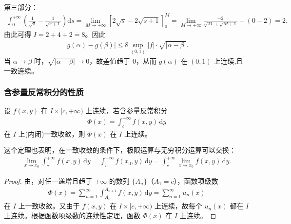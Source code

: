 \documentclass[../../main.tex]{subfiles}%
\begin{document}
\begin{solution}
\begin{enumerate}[(1)]
\begin{align*}
\end{align*}
第三部分：
\begin{align*}
\int_{0}^{+\infty} \left( \frac{1}{\sqrt{s}} - \frac{1}{\sqrt{s+1}} \right) \mathrm{d}s = \lim_{M \to +\infty} \left[ 2\sqrt{s} - 2\sqrt{s+1} \right]_{0}^{M} = \lim_{M \to +\infty} \frac{-2}{\sqrt{M} + \sqrt{M+1}} - (0 - 2) = 2.
\end{align*}
由此可得 \(I = 2 + 4 + 2 = 8\)。因此
\begin{align*}
|g(\alpha) - g(\beta)| \leqslant 8 \sup_{(0,1)} |f| \cdot \sqrt{|\alpha - \beta|}.
\end{align*}
当 \(\alpha \to \beta\) 时，\(\sqrt{|\alpha - \beta|} \to 0\)，故差值趋于 \(0\)，从而 \(g(\alpha)\) 在 \((0,1)\) 上连续,且一致连续。
\end{enumerate}
\end{solution}

\subsubsection{含参量反常积分的性质}

\begin{theorem}[含参反常积分的连续性]\label{theorem:含参量反常积分的连续性}
设 \( f(x,y) \) 在 \( I \times [c, +\infty) \) 上连续，若含参量反常积分
\begin{align}\label{12}
\Phi(x) = \int_{c}^{+\infty} f(x,y) \, \mathrm{d}y
\end{align}
在 \( I \) 上(内闭)一致收敛，则 \( \Phi(x) \) 在 \( I \) 上连续。
\end{theorem}
\begin{note}
这个定理也表明，在一致收敛的条件下，极限运算与无穷积分运算可以交换：
\begin{align}\label{eq::::--34802jrw4f3454t}
\lim_{x \to x_0} \int_{c}^{+\infty} f(x,y) \, \mathrm{d}y = \int_{c}^{+\infty} f(x_0,y) \, \mathrm{d}y = \int_{c}^{+\infty} \lim_{x \to x_0} f(x,y) \, \mathrm{d}y.
\end{align}
\end{note}
\begin{proof}
由，对任一递增且趋于 \( +\infty \) 的数列 \( \{A_n\} \)（\( A_1 = c \)），函数项级数
\begin{align}\label{eq::::--34802jrw4f34t}
\Phi(x) = \sum_{n=1}^{\infty} \int_{A_n}^{A_{n+1}} f(x,y) \, \mathrm{d}y = \sum_{n=1}^{\infty} u_n(x)
\end{align}
在 \( I \) 上一致收敛。又由于 \( f(x,y) \) 在 \( I \times [c, +\infty) \) 上连续，故每个 \( u_n(x) \) 都在 \( I \) 上连续。根据函数项级数的连续性定理，函数 \( \Phi(x) \) 在 \( I \) 上连续。
\end{proof}
\end{document}

